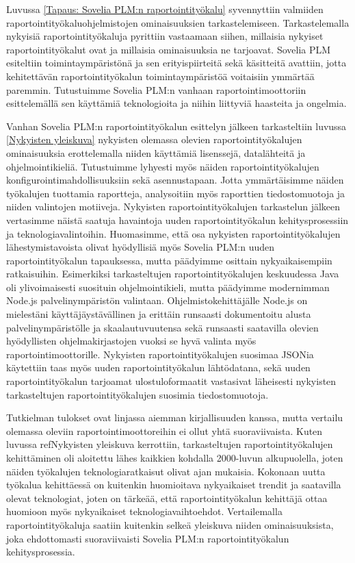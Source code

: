 Luvussa \ref{Tapaus: Sovelia PLM:n raportointityökalu} syvennyttiin valmiiden raportointityökaluohjelmistojen ominaisuuksien tarkastelemiseen. Tarkastelemalla nykyisiä raportointityökaluja pyrittiin vastaamaan siihen, millaisia nykyiset raportointityökalut ovat ja millaisia ominaisuuksia ne tarjoavat. Sovelia PLM esiteltiin toimintaympäristönä ja sen erityispiirteitä sekä käsitteitä avattiin, jotta kehitettävän raportointityökalun toimintaympäristöä voitaisiin ymmärtää paremmin. Tutustuimme Sovelia PLM:n vanhaan raportointimoottoriin esittelemällä sen käyttämiä teknologioita ja niihin liittyviä haasteita ja ongelmia.

Vanhan Sovelia PLM:n raportointityökalun esittelyn jälkeen tarkasteltiin luvussa \ref{Nykyisten yleiskuva} nykyisten olemassa olevien raportointityökalujen ominaisuuksia erottelemalla niiden käyttämiä lisenssejä, datalähteitä ja ohjelmointikieliä. Tutustuimme lyhyesti myös näiden raportointityökalujen konfigurointimahdollisuuksiin sekä asennustapaan. Jotta ymmärtäisimme näiden työkalujen tuottamia raportteja, analysoitiin myös raporttien tiedostomuotoja ja niiden valintojen motiiveja. Nykyisten raportointityökalujen tarkastelun jälkeen vertasimme näistä saatuja havaintoja uuden raportointityökalun kehitysprosessiin ja teknologiavalintoihin. Huomasimme, että osa nykyisten raportointityökalujen lähestymistavoista olivat hyödyllisiä myös Sovelia PLM:n uuden raportointityökalun tapauksessa, mutta päädyimme osittain nykyaikaisempiin ratkaisuihin. Esimerkiksi tarkasteltujen raportointityökalujen keskuudessa Java oli ylivoimaisesti suosituin ohjelmointikieli, mutta päädyimme modernimman Node.js palvelinympäristön valintaan. Ohjelmistokehittäjälle Node.js on mielestäni käyttäjäystävällinen ja erittäin runsaasti dokumentoitu alusta palvelinympäristölle ja skaalautuvuutensa sekä runsaasti saatavilla olevien hyödyllisten ohjelmakirjastojen vuoksi se hyvä valinta myös raportointimoottorille. Nykyisten raportointityökalujen suosimaa JSONia käytettiin taas myös uuden raportointityökalun lähtödatana, sekä uuden raportointityökalun tarjoamat ulostuloformaatit vastasivat läheisesti nykyisten tarkasteltujen raportointityökalujen suosimia tiedostomuotoja.

Tutkielman tulokset ovat linjassa aiemman kirjallisuuden kanssa, mutta vertailu olemassa oleviin raportointimoottoreihin ei ollut yhtä suoraviivaista. Kuten luvussa ref{Nykyisten yleiskuva} kerrottiin, tarkasteltujen raportointityökalujen kehittäminen oli aloitettu lähes kaikkien kohdalla 2000-luvun alkupuolella, joten näiden työkalujen teknologiaratkaisut olivat ajan mukaisia. Kokonaan uutta työkalua kehittäessä on kuitenkin huomioitava nykyaikaiset trendit ja saatavilla olevat teknologiat, joten on tärkeää, että raportointityökalun kehittäjä ottaa huomioon myös nykyaikaiset teknologiavaihtoehdot. Vertailemalla raportointityökaluja saatiin kuitenkin selkeä yleiskuva niiden ominaisuuksista, joka ehdottomasti suoraviivaisti Sovelia PLM:n raportointityökalun kehitysprosessia.


